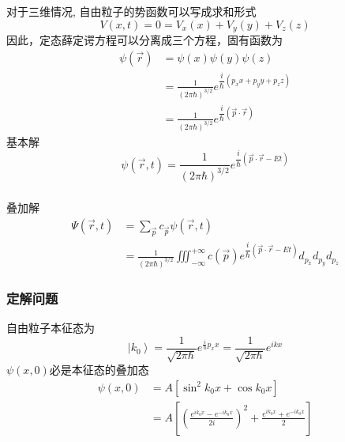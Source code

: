 \begin{frame}
  \frametitle{}
对于三维情况, 自由粒子的势函数可以写成求和形式
$$ V(x,t) = 0 = V_x(x) + V_y(y) + V_z(z)$$
因此，定态薛定谔方程可以分离成三个方程，固有函数为
$$
\begin{aligned}
	\psi(\vec{r}) &= \psi(x) \psi(y) \psi(z)\\ 
	&=\frac{1}{(2\pi \hbar)^{3/2}}e^{\dfrac{i}{\hbar}(p_x x + p_y y + p_z z)} \\
	&=\frac{1}{(2\pi \hbar)^{3/2}}e^{\dfrac{i}{\hbar}(\vec{p} \cdot \vec{r})} 
\end{aligned}
$$
基本解
$$
\psi(\vec{r},t) =  \frac{1}{(2\pi \hbar)^{3/2}}e^{\dfrac{i}{\hbar}(\vec{p} \cdot \vec{r}-Et)} 
$$
\end{frame} 

\begin{frame}
    \frametitle{}
  叠加解
  $$
  \begin{aligned}
    \Psi(\vec{r},t) &= \sum_{\vec{p}} c_{\vec{p}}\psi(\vec{r},t) \\ 
    &=\frac{1}{(2\pi \hbar)^{3/2}} \iiint_{-\infty}^{+\infty}c(\vec{p} )e^{\dfrac{i}{\hbar}(\vec{p} \cdot \vec{r}-Et)} d_{p_x} d_{p_y}d_{p_z}
  \end{aligned}  
  $$
\end{frame} 

\begin{frame}[label=current]
  \frametitle{定解问题}
\解 自由粒子本征态为
\[ \left\vert k_0 \right\rangle = \frac{1}{\sqrt{2\pi \hbar}} e^ {\frac{i}{\hbar} p_x x}= \frac{1}{\sqrt{2\pi \hbar}} e^ {i k x}\]
$\psi(x,0)$必是本征态的叠加态
\[ \begin{aligned}
  \psi(x,0) &= A\left[\sin^2 k_0 x + \cos k_0 x\right] \\ 
  &= A\left[\left(\frac{e^{ik_0 x}- e^{-ik_0 x}}{2i}\right)^2+ \frac{e^{ik_0 x}+ e^{-ik_0 x}}{2}\right] \\
\end{aligned}\]
\end{frame} 

